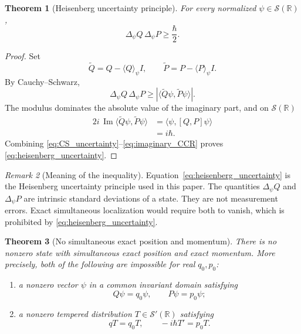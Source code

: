 \documentclass[11pt]{amsart}
\numberwithin{equation}{section}
\theoremstyle{plain}
\newtheorem{theorem}{Theorem}[section]
\theoremstyle{definition}
\theoremstyle{remark}
\newtheorem{remark}[theorem]{Remark}
\newcommand{\R}{\mathbb{R}}
\newcommand{\Sch}{\mathcal{S}}
\begin{document}
\begin{theorem}[Heisenberg uncertainty principle]
\label{thm:heisenberg_uncertainty}
For every normalized \(\psi\in\Sch(\R)\),
\begin{equation}
\boxed{
\Delta_\psi Q\,\Delta_\psi P
\ge
\frac{\hbar}{2}.}
\label{eq:heisenberg_uncertainty}
\end{equation}
\end{theorem}

\begin{proof}
Set
\begin{equation}
\widetilde Q=Q-\langle Q\rangle_\psi I,
\qquad
\widetilde P=P-\langle P\rangle_\psi I.
\label{eq:centered_QP}
\end{equation}
By Cauchy--Schwarz,
\begin{equation}
\Delta_\psi Q\,\Delta_\psi P
\ge
\left|\langle\widetilde Q\psi,\widetilde P\psi\rangle\right|.
\label{eq:CS_uncertainty}
\end{equation}
The modulus dominates the absolute value of the imaginary part, and on
\(\Sch(\R)\)
\begin{align}
2i\,\operatorname{Im}
\langle\widetilde Q\psi,\widetilde P\psi\rangle
&=
\langle\psi,[Q,P]\psi\rangle
\label{eq:imaginary_commutator}\\
&=i\hbar.
\label{eq:imaginary_CCR}
\end{align}
Combining \eqref{eq:CS_uncertainty}--\eqref{eq:imaginary_CCR} proves
\eqref{eq:heisenberg_uncertainty}.
\end{proof}

\begin{remark}[Meaning of the inequality]
\label{rem:uncertainty_meaning}
Equation~\eqref{eq:heisenberg_uncertainty} is the Heisenberg uncertainty
principle used in this paper.  The quantities \(\Delta_\psi Q\) and
\(\Delta_\psi P\) are intrinsic standard deviations of a state.  They are
not measurement errors.  Exact simultaneous localization would require both
to vanish, which is prohibited by \eqref{eq:heisenberg_uncertainty}.
\end{remark}

\begin{theorem}[No simultaneous exact position and momentum]
\label{thm:no_joint_eigenstate}
There is no nonzero state with simultaneous exact position and exact momentum.
More precisely, both of the following are impossible for real \(q_0,p_0\):
\begin{enumerate}[leftmargin=*]
\item a nonzero vector \(\psi\) in a common invariant domain satisfying
\begin{equation}
Q\psi=q_0\psi,
\qquad
P\psi=p_0\psi;
\label{eq:joint_eigenstate_assumption}
\end{equation}
\item a nonzero tempered distribution \(T\in\Sch'(\R)\) satisfying
\begin{equation}
qT=q_0T,
\qquad
-i\hbar T'=p_0T.
\label{eq:joint_distribution_assumption}
\end{equation}
\end{enumerate}
\end{theorem}
\end{document}
